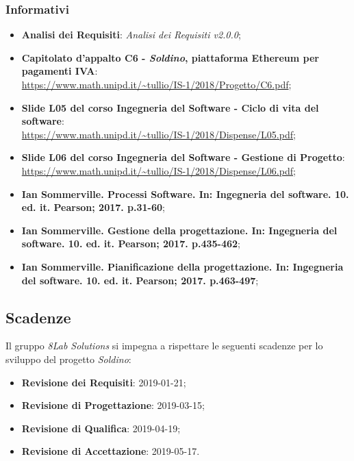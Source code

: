 \subsubsection{Informativi}
\begin{itemize}
	
	\item \textbf{Analisi dei Requisiti}:
	\textit{Analisi dei Requisiti v2.0.0};
	\item \textbf{Capitolato d'appalto C6 - \textit{Soldino}, piattaforma Ethereum per pagamenti IVA}: \\
	\url{https://www.math.unipd.it/~tullio/IS-1/2018/Progetto/C6.pdf};
	\item \textbf{Slide L05 del corso Ingegneria del Software - Ciclo di vita 
		del software}:\\
	\url{https://www.math.unipd.it/~tullio/IS-1/2018/Dispense/L05.pdf};
	\item \textbf{Slide L06 del corso Ingegneria del Software - Gestione di 
	Progetto}: \\
	\url{https://www.math.unipd.it/~tullio/IS-1/2018/Dispense/L06.pdf};
		
	\item \textbf{Ian Sommerville. Processi Software. In: Ingegneria del software.
	10. ed. it. Pearson; 2017. p.31-60};
	\item \textbf{Ian Sommerville. Gestione della progettazione. In: Ingegneria del software.
	10. ed. it. Pearson; 2017. p.435-462};
	\item \textbf{Ian Sommerville. Pianificazione della progettazione. In: Ingegneria del software.
	10. ed. it. Pearson; 2017. p.463-497};
\end{itemize}

\hypertarget{scadenze}{\subsection{Scadenze}}
Il gruppo \textit{8Lab Solutions} si impegna a rispettare le seguenti scadenze per lo 
sviluppo del progetto \textit{Soldino}:

\begin{itemize}
	\item \textbf{Revisione dei Requisiti}: 2019-01-21;
	\item \textbf{Revisione di Progettazione}: 2019-03-15;
	\item \textbf{Revisione di Qualifica}: 2019-04-19;
	\item \textbf{Revisione di Accettazione}: 2019-05-17.
\end{itemize}